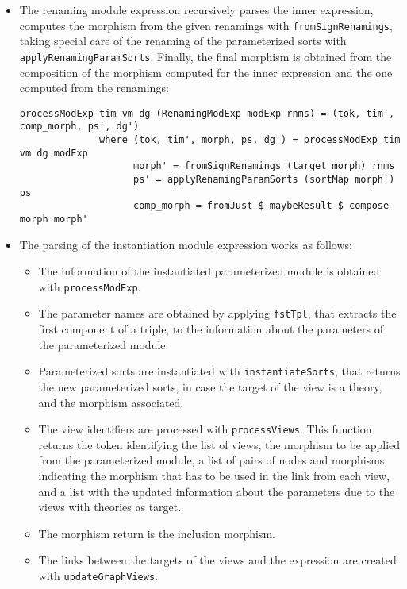 \begin{itemize}
\item The renaming module expression recursively parses the inner expression, computes the morphism from the given renamings with \verb"fromSignRenamings",
taking special care of the renaming of the parameterized sorts with
\verb"applyRenamingParamSorts". Finally, the final morphism is obtained
from the composition of the morphism computed for the inner expression and
the one computed from the renamings:


{\codesize
\begin{verbatim}
processModExp tim vm dg (RenamingModExp modExp rnms) = (tok, tim', comp_morph, ps', dg')
              where (tok, tim', morph, ps, dg') = processModExp tim vm dg modExp
                    morph' = fromSignRenamings (target morph) rnms
                    ps' = applyRenamingParamSorts (sortMap morph') ps
                    comp_morph = fromJust $ maybeResult $ compose morph morph'
\end{verbatim}
}

\item The parsing of the instantiation module expression works as follows:

\begin{itemize}
\item The information of the instantiated parameterized module is obtained
with \verb"processModExp".
\item The parameter names are obtained by applying \verb"fstTpl", that
extracts the first component of a triple, to the information about the
parameters of the parameterized module.
\item Parameterized sorts are instantiated with \verb"instantiateSorts",
that returns the new parameterized sorts, in case the target of the view
is a theory, and the morphism associated.
\item The view identifiers are processed with \verb"processViews". This
function returns the token identifying the list of views, the morphism
to be applied from the parameterized module, a list of pairs of nodes
and morphisms, indicating the morphism that has to be used in the link
from each view, and a list with the updated information about the
parameters due to the views with theories as target.
\item The morphism return is the inclusion morphism.
\item The links between the targets of the views and the expression
are created with \verb"updateGraphViews". 
\end{itemize}


\end{itemize}
